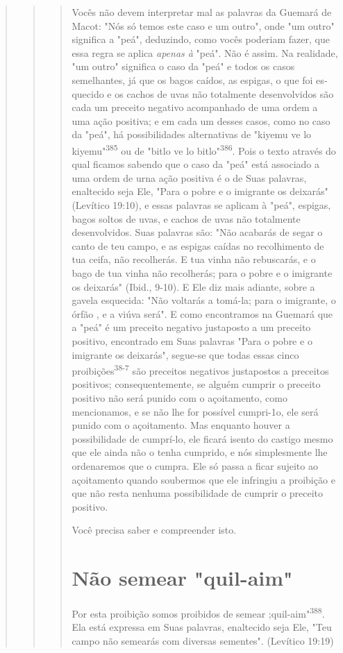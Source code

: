 \begin{quote}
\begin{quote}
\begin{quote}
Vocês não devem interpretar mal as palavras da Guemará de Macot: "Nós só
temos este caso e um outro", onde "um outro" significa a "peá",
deduzindo, como vocês poderiam fazer, que essa regra se aplica
\emph{apenas à} "peá". Não é assim. Na realidade, "um outro" significa o
caso da "peá" e todos os casos semelhantes, já que os bagos caídos, as
espigas, o que foi es­quecido e os cachos de uvas não totalmente
desenvolvidos são cada um pre­ceito negativo acompanhado de uma ordem a
uma ação positiva; e em cada um desses casos, como no caso da "peá", há
possibilidades alternativas de "kiyemu ve lo
kiyemu"\textsuperscript{385} ou de "bitlo ve lo
bitlo"\textsuperscript{386}. Pois o texto através do qual ficamos
sabendo que o caso da "peá" está associado a uma ordem de urna ação
positiva é o de Suas palavras, enaltecido seja Ele, "Para o pobre e o
imigrante os deixarás" (Levítico 19:10), e essas palavras se aplicam à
"peá", espigas, bagos soltos de uvas, e cachos de uvas não totalmente
desenvolvidos. Suas palavras são: "Não acabarás de segar o canto de teu
campo, e as espigas caídas no recolhimento de tua ceifa, não recolherás.
E tua vinha não rebusca­rás, e o bago de tua vinha não recolherás; para
o pobre e o imigrante os deixa­rás" (Ibid., 9-10). E Ele diz mais
adiante, sobre a gavela esquecida: "Não volta­rás a tomá-la; para o
imigrante, o órfão , e a viúva será". E como encontramos na Guemará que
a "peá" é um preceito negativo justaposto a um preceito positivo,
encontrado em Suas palavras "Para o pobre e o imigrante os deixa­rás",
segue-se que todas essas cinco proibições\textsuperscript{38-7} são
preceitos negativos jus­tapostos a preceitos positivos;
consequentemente, se alguém cumprir o pre­ceito positivo não será punido
com o açoitamento, como mencionamos, e se não lhe for possível
cumpri-1o, ele será punido com o açoitamento. Mas enquanto houver a
possibilidade de cumprí-lo, ele ficará isento do castigo mesmo que ele
ainda não o tenha cumprido, e nós simplesmente lhe ordena­remos que o
cumpra. Ele só passa a ficar sujeito ao açoitamento quando sou­bermos
que ele infringiu a proibição e que não resta nenhuma possibilidade de
cumprir o preceito positivo.

Você precisa saber e compreender isto.

\section{Não semear "quil-aim"}

Por esta proibição somos proibidos de semear
;quil-aim"\textsuperscript{388}. Ela es­tá expressa em Suas palavras,
enaltecido seja Ele, "Teu campo não semearás com diversas
sementes". (Levítico 19:19)


\end{quote}
\end{quote}
\end{quote}
